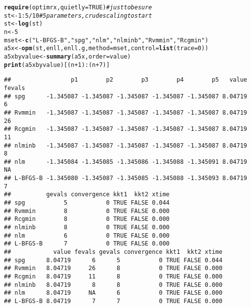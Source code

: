\documentclass[11pt]{article}\usepackage[]{graphicx}\usepackage[]{color}
\makeatletter
\newcommand{\hlnum}[1]{\textcolor[rgb]{0.686,0.059,0.569}{#1}}%
\newcommand{\hlstr}[1]{\textcolor[rgb]{0.192,0.494,0.8}{#1}}%
\newcommand{\hlcom}[1]{\textcolor[rgb]{0.678,0.584,0.686}{\textit{#1}}}%
\newcommand{\hlopt}[1]{\textcolor[rgb]{0,0,0}{#1}}%
\newcommand{\hlstd}[1]{\textcolor[rgb]{0.345,0.345,0.345}{#1}}%
\newcommand{\hlkwb}[1]{\textcolor[rgb]{0.69,0.353,0.396}{#1}}%
\newcommand{\hlkwc}[1]{\textcolor[rgb]{0.333,0.667,0.333}{#1}}%
\newcommand{\hlkwd}[1]{\textcolor[rgb]{0.737,0.353,0.396}{\textbf{#1}}}%
\newenvironment{kframe}{%
 \def\at@end@of@kframe{}%
 \ifinner\ifhmode%
  \def\at@end@of@kframe{\end{minipage}}%
  \begin{minipage}{\columnwidth}%
 \fi\fi%
 \def\FrameCommand##1{\hskip\@totalleftmargin \hskip-\fboxsep
 \colorbox{shadecolor}{##1}\hskip-\fboxsep
     \hskip-\linewidth \hskip-\@totalleftmargin \hskip\columnwidth}%
 \MakeFramed {\advance\hsize-\width
   \@totalleftmargin\z@ \linewidth\hsize
   \@setminipage}}%
 {\par\unskip\endMakeFramed%
 \at@end@of@kframe}
\newenvironment{knitrout}{}{} %
\makeatother
\begin{document}
\begin{knitrout}\scriptsize
{}\color{fgcolor}\begin{kframe}
\begin{alltt}
\hlkwd{require}\hlstd{(optimrx,} \hlkwc{quietly}\hlstd{=}\hlnum{TRUE}\hlstd{)} \hlcom{# just to be sure}
\hlstd{st}\hlkwb{<-}\hlnum{1}\hlopt{:}\hlnum{5}\hlopt{/}\hlnum{10} \hlcom{# 5 parameters, crude scaling to start}
\hlstd{st}\hlkwb{<-}\hlkwd{log}\hlstd{(st)}
\hlstd{n} \hlkwb{<-} \hlnum{5}
\hlstd{mset}\hlkwb{<-}\hlkwd{c}\hlstd{(}\hlstr{"L-BFGS-B"}\hlstd{,} \hlstr{"spg"}\hlstd{,} \hlstr{"nlm"}\hlstd{,} \hlstr{"nlminb"}\hlstd{,} \hlstr{"Rvmmin"}\hlstd{,} \hlstr{"Rcgmin"}\hlstd{)}
\hlstd{a5x}\hlkwb{<-}\hlkwd{opm}\hlstd{(st, enll, enll.g,} \hlkwc{method}\hlstd{=mset,} \hlkwc{control}\hlstd{=}\hlkwd{list}\hlstd{(}\hlkwc{trace}\hlstd{=}\hlnum{0}\hlstd{))}
\hlstd{a5xbyvalue}\hlkwb{<-}\hlkwd{summary}\hlstd{(a5x,} \hlkwc{order}\hlstd{=value)}
\hlkwd{print}\hlstd{(a5xbyvalue)[(n}\hlopt{+}\hlnum{1}\hlstd{)}\hlopt{:}\hlstd{(n}\hlopt{+}\hlnum{7}\hlstd{)]}
\end{alltt}
\begin{verbatim}
##                 p1        p2        p3        p4        p5   value fevals
## spg      -1.345087 -1.345087 -1.345087 -1.345087 -1.345087 8.04719      6
## Rvmmin   -1.345087 -1.345087 -1.345087 -1.345087 -1.345087 8.04719     26
## Rcgmin   -1.345087 -1.345087 -1.345087 -1.345087 -1.345087 8.04719     11
## nlminb   -1.345087 -1.345087 -1.345087 -1.345087 -1.345087 8.04719      8
## nlm      -1.345084 -1.345085 -1.345086 -1.345088 -1.345091 8.04719     NA
## L-BFGS-B -1.345080 -1.345087 -1.345085 -1.345088 -1.345093 8.04719      7
##          gevals convergence kkt1  kkt2 xtime
## spg           5           0 TRUE FALSE 0.044
## Rvmmin        8           0 TRUE FALSE 0.000
## Rcgmin        8           0 TRUE FALSE 0.000
## nlminb        8           0 TRUE FALSE 0.000
## nlm           6           0 TRUE FALSE 0.000
## L-BFGS-B      7           0 TRUE FALSE 0.000
##            value fevals gevals convergence kkt1  kkt2 xtime
## spg      8.04719      6      5           0 TRUE FALSE 0.044
## Rvmmin   8.04719     26      8           0 TRUE FALSE 0.000
## Rcgmin   8.04719     11      8           0 TRUE FALSE 0.000
## nlminb   8.04719      8      8           0 TRUE FALSE 0.000
## nlm      8.04719     NA      6           0 TRUE FALSE 0.000
## L-BFGS-B 8.04719      7      7           0 TRUE FALSE 0.000
\end{verbatim}
\begin{alltt}

\end{alltt}
\end{kframe}
\end{knitrout}
\end{document}
